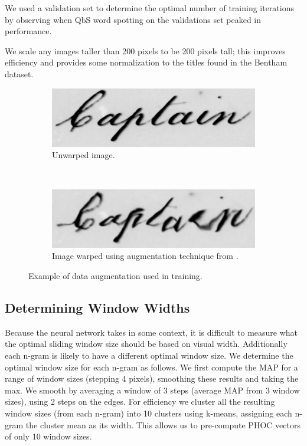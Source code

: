 \documentclass[ms,electronic,twosidetoc,letterpaper,chaptercenter,parttop,lol,lof,lot]{byumsphd}
\begin{document}
We used a validation set to determine the optimal number of training iterations by observing when QbS word spotting on the validations set peaked in performance.

We scale any images taller than 200 pixels to be 200 pixels tall; this improves efficiency and provides some normalization to the titles found in the Bentham dataset.

\begin{figure}
    \centering
    \begin{subfigure}[t]{0.46\textwidth}
    		\centering
    		\includegraphics[width=\textwidth]{Captain_unwarped}
    		\caption{Unwarped image.}
    	\end{subfigure}
    	~
    	\begin{subfigure}[t]{0.46\textwidth}
    		\centering
    		\includegraphics[width=\textwidth]{Captain_warped}
    		\caption{Image warped using augmentation technique from \cite{wigington2017}.}
    	\end{subfigure}
    	\caption{Example of data augmentation used in training.}
    	\label{fig:augmentation}
\end{figure}

\subsection{Determining Window Widths}\label{detirminewindowsize}
Because the neural network takes in some context, it is difficult to measure what the optimal sliding window size should be based on visual width.
Additionally each n-gram is likely to have a different optimal window size. We determine the optimal window size for each n-gram as follows.
We first compute the MAP for a range of window sizes (stepping 4 pixels), smoothing these results and taking the max. We smooth by averaging a window of 3 steps (average MAP from 3 window sizes), using 2 steps on the edges. For efficiency we cluster all the resulting window sizes (from each n-gram) into 10 clusters using k-means, assigning each n-gram the cluster mean as its width. This allows us to pre-compute PHOC vectors of only 10 window sizes.%
\end{document}
